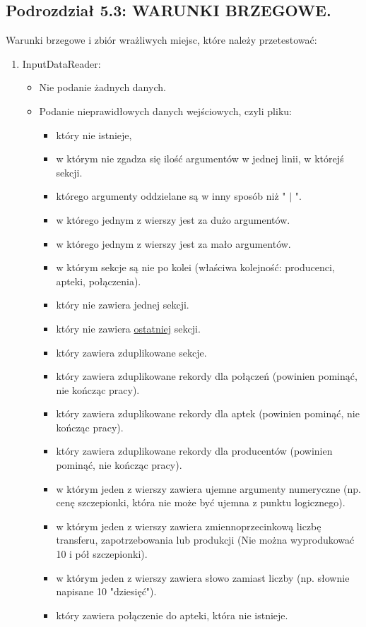 \documentclass[a4paper]{article}
\begin{document}
\subsection*{Podrozdział 5.3: WARUNKI BRZEGOWE.}
Warunki brzegowe i zbiór wrażliwych miejsc, które należy przetestować:
\begin{enumerate}
\item InputDataReader:
	\begin{itemize}
	\item Nie podanie żadnych danych.
	\item Podanie nieprawidłowych danych wejściowych, czyli pliku:
		\begin{itemize}
		\item który nie istnieje,
		\item w którym nie zgadza się ilość argumentów w jednej linii, w którejś sekcji.
		\item którego argumenty oddzielane są w inny sposób niż " $|$ ".
		\item w którego jednym z wierszy jest za dużo argumentów.
		\item w którego jednym z wierszy jest za mało argumentów.
		\item w którym sekcje są nie po kolei (właściwa kolejność: producenci, apteki, połączenia).
		\item który nie zawiera jednej sekcji.
		\item który nie zawiera \underline{ostatniej} sekcji.
		\item który zawiera zduplikowane sekcje.
		\item który zawiera zduplikowane rekordy dla połączeń (powinien pominąć, nie kończąc pracy).
		\item który zawiera zduplikowane rekordy dla aptek (powinien pominąć, nie kończąc pracy).
		\item który zawiera zduplikowane rekordy dla producentów (powinien pominąć, nie kończąc pracy).
		\item w którym jeden z wierszy zawiera ujemne argumenty numeryczne (np. cenę szczepionki, która nie może być ujemna z punktu logicznego).
		\item w którym jeden z wierszy zawiera zmiennoprzecinkową liczbę transferu, zapotrzebowania lub produkcji (Nie można wyprodukować 10 i pół szczepionki).
		\item w którym jeden z wierszy zawiera słowo zamiast liczby (np. słownie napisane 10 "dziesięć").
		\item który zawiera połączenie do apteki, która nie istnieje.

\end{itemize}
\end{itemize}
\end{enumerate}
\end{document}
